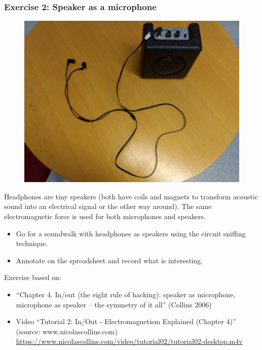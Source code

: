 \documentclass[screen, aspectratio=43]{beamer}
\begin{document}
\begin{frame}
  \frametitle{Exercise 2: Speaker as a microphone}
 \begin{figure}
	\includegraphics[scale=0.05]{img/coilsamps.jpg}
\end{figure}
{\scriptsize 
Headphones are tiny speakers (both have coils and magnets to transform acoustic sound into an electrical signal or the other way around). The same electromagnetic force is used for both microphones and speakers.
    \begin{itemize}
	\item Go for a soundwalk with headphones as speakers using the circuit sniffing technique.    
	\item Annotate on the spreadsheet and record what is interesting.
    \end{itemize}
 }   
    {\tiny Exercise based on:
     \begin{itemize}
    	\item ``Chapter 4. In/out (the eight rule of hacking): speaker as microphone, microphone as speaker -- the symmetry of it all'' (Collins 2006)
	\item Video ``Tutorial 2: In/Out - Electromagnetism Explained (Chapter 4)'' (source: www.nicolascollins.com)\\ 
	\url{https://www.nicolascollins.com/video/tutorial02/tutorial02-desktop.m4v} 
      \end{itemize}	
    }
       
\end{frame}
%
\end{document}
